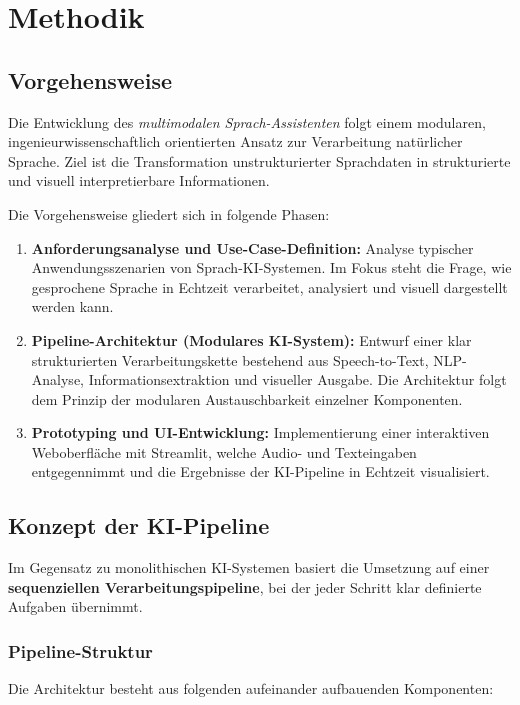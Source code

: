 \chapter{Methodik}
\label{sec:methodik}

\section{Vorgehensweise}
Die Entwicklung des \textit{multimodalen Sprach-Assistenten} folgt einem modularen, ingenieurwissenschaftlich orientierten Ansatz zur Verarbeitung natürlicher Sprache. Ziel ist die Transformation unstrukturierter Sprachdaten in strukturierte und visuell interpretierbare Informationen.

Die Vorgehensweise gliedert sich in folgende Phasen:

\begin{enumerate}
    \item \textbf{Anforderungsanalyse und Use-Case-Definition:}  
    Analyse typischer Anwendungsszenarien von Sprach-KI-Systemen. Im Fokus steht die Frage, wie gesprochene Sprache in Echtzeit verarbeitet, analysiert und visuell dargestellt werden kann.

    \item \textbf{Pipeline-Architektur (Modulares KI-System):}  
    Entwurf einer klar strukturierten Verarbeitungskette bestehend aus Speech-to-Text, NLP-Analyse, Informationsextraktion und visueller Ausgabe. Die Architektur folgt dem Prinzip der modularen Austauschbarkeit einzelner Komponenten.

    \item \textbf{Prototyping und UI-Entwicklung:}  
    Implementierung einer interaktiven Weboberfläche mit Streamlit, welche Audio- und Texteingaben entgegennimmt und die Ergebnisse der KI-Pipeline in Echtzeit visualisiert.
\end{enumerate}

\section{Konzept der KI-Pipeline}
Im Gegensatz zu monolithischen KI-Systemen basiert die Umsetzung auf einer \textbf{sequenziellen Verarbeitungspipeline}, bei der jeder Schritt klar definierte Aufgaben übernimmt.

\subsection{Pipeline-Struktur}
Die Architektur besteht aus folgenden aufeinander aufbauenden Komponenten:

